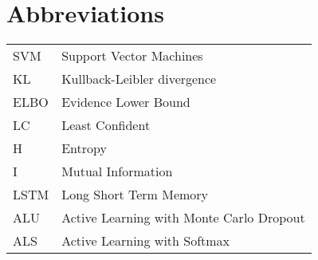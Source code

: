 \documentclass[11pt,oneside,a4paper]{book}
\begin{document}








\tableofcontents    %

\chapter{Abbreviations}
\begin{tabular}{ll}
  SVM & Support Vector Machines\\
  KL & Kullback-Leibler divergence\\
  ELBO & Evidence Lower Bound\\
  LC & Least Confident\\
  H & Entropy\\
  I & Mutual Information\\
  LSTM & Long Short Term Memory\\
  ALU & Active Learning with Monte Carlo Dropout\\
  ALS & Active Learning with Softmax\\
\end{tabular}
\end{document}
